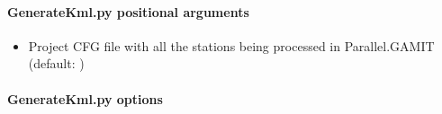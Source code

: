 \documentclass[letterpaper,10pt,english]{sphinxmanual}
\begin{document}
\paragraph{GenerateKml.py positional arguments}
\label{\detokenize{parallel_gamit:GenerateKml.py-positional-arguments}}\begin{itemize}
\item {} 
\sphinxAtStartPar
{\hyperref[\detokenize{parallel_gamit:GenerateKml.py-_project-cfg-file_}]{}} \sphinxhyphen{} Project CFG file with all the stations being processed in Parallel.GAMIT (default: )

\end{itemize}


\paragraph{GenerateKml.py options}
\end{document}
